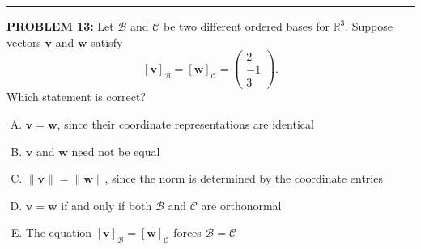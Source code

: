 \documentclass[12pt]{amsart}
\newcommand{\divider}{
  \vspace{-1em} %
  \noindent
  \raisebox{-0.15ex}{\textbullet}%
  \hspace{0.5em}%
  \rule[0.5ex]{0.95\textwidth}{1.0pt}%
  \hspace{0.5em}%
  \raisebox{-0.15ex}{\textbullet}%
  \vspace{0em} %
}
\begin{document}
%
\divider


{\bf PROBLEM 13:}
%
Let $\mathcal{B}$ and $\mathcal{C}$ be two different ordered bases for $\mathbb{R}^3$. Suppose vectors $\mathbf{v}$ and $\mathbf{w}$ satisfy
$$[\mathbf{v}]_{\mathcal{B}} = [\mathbf{w}]_{\mathcal{C}} = \begin{pmatrix} 2 \\ -1 \\ 3 \end{pmatrix}.$$
Which statement is correct?

\begin{enumerate}[(A)]
\item $\mathbf{v} = \mathbf{w}$, since their coordinate representations are identical
\item $\mathbf{v}$ and $\mathbf{w}$ need not be equal
\item $\|\mathbf{v}\| = \|\mathbf{w}\|$, since the norm is determined by the coordinate entries
\item $\mathbf{v} = \mathbf{w}$ if and only if both $\mathcal{B}$ and $\mathcal{C}$ are orthonormal
\item The equation $[\mathbf{v}]_{\mathcal{B}} = [\mathbf{w}]_{\mathcal{C}}$ forces $\mathcal{B} = \mathcal{C}$
\end{enumerate}
\end{document}
